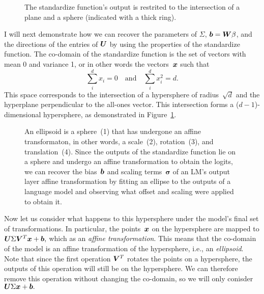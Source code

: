 \documentclass{article}
\begin{document}
\begin{figure}
  \centering
  \small
  
  \caption{The standardize function's output is restrited to the intersection of a plane and a sphere (indicated with a thick ring).}
  \label{fig:standardize}
\end{figure}

I will next demonstrate how we can recover the parameters of \(\Sigma\), 
\({\bm{b}}={\bm{W}}\beta\), and the directions of the entries of \({\bm{U}}\)
by using the properties of the standardize function.
The co-domain of the standardize function
is the set of vectors with mean 0 and variance 1,
or in other words the vectors~\({\bm{x}}\) such that 
\[\sum_i^dx_i=0\quad\text{and}\quad \sum_i^dx_i^2=d.\]
This space corresponds to the intersection of a hypersphere of radius~\(\sqrt{d}\)
and the hyperplane perpendicular to the all-ones vector.
This intersection forms a (\(d-1\))-dimensional hypersphere,
as demonstrated in Figure~\ref{fig:standardize}.

\begin{figure}
  \centering
  
  \caption{
    An ellipsoid is a sphere~(1) that has undergone an affine transformaton, in other words, a scale~(2), rotation~(3), and translation~(4).
    Since the outputs of the standardize function lie on a sphere
    and undergo an affine transformation to obtain the logits,
    we can recover the bias~\({\bm{b}}\) and scaling terms~\(\boldsymbol\sigma\)
    of an LM's output layer affine transformation
    by fitting an ellipse to the outputs of a language model 
    and observing what offset and scaling were applied to obtain it.
  }
\end{figure}

Now let us consider what happens to this hypersphere under the model's final set of transformations.
In particular, the points~\({\bm{x}}\) on the hypersphere are mapped to 
\({\bm{U}}\Sigma{\bm{V}}^T{\bm{x}} + {\bm{b}},\)
which as an \emph{affine transformation}.
This means that the co-domain of the model is an affine transformation of the hypersphere, i.e., an \emph{ellipsoid}.
Note that since the first operation \({\bm{V}}^T\) rotates the points on a hypersphere,
the outputs of this operation will still be on the hypersphere.
We can therefore remove this operation without changing the co-domain, 
so we will only conisder \({\bm{U}}\Sigma{\bm{x}} + {\bm{b}}.\)
\end{document}

